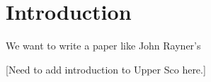 \section{Introduction}
  



  
We want to write a paper like John Rayner's \cite{Rayner_2003}
  \cite{Vacca_2003}
  
  
[Need to add introduction to Upper Sco here.]\\
[start at same level as UROP - difference between old and young stars]
  
  
  